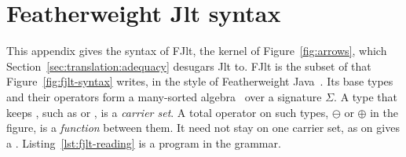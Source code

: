 \section{Featherweight Jlt syntax}
\label{app:fjlt:syntax}

This appendix gives the syntax of FJlt, the kernel of Figure~\ref{fig:arrows}, which Section~\ref{sec:translation:adequacy} desugars Jlt to.
FJlt is the subset of  that Figure~\ref{fig:fjlt-syntax} writes, in the style of Featherweight Java~\cite{igarashi2001featherweight}.
Its base types and their  operators form a many-sorted algebra~\cite{birkhoff1970heterogeneous,sannella2012foundations} over a signature $\Sigma$.
A type that keeps \RuleOne{}, such as  or , is a \emph{carrier set}.
A total operator on such types, $\ominus$ or $\oplus$ in the figure, is a \emph{function} between them.
It need not stay on one carrier set, as \cppinline{==} on  gives a .
Listing~\ref{lst:fjlt-reading} is a program in the grammar.

